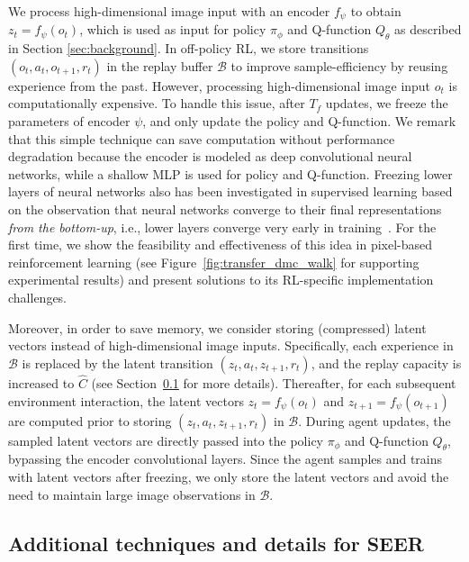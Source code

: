 \documentclass{article}
\begin{document}
We process high-dimensional image input with an encoder $f_{\psi}$ to obtain $z_t = f_{\psi}(o_t)$, which is used as input for policy $\pi_{\phi}$ and Q-function $Q_\theta$ as described in Section \ref{sec:background}. In off-policy RL, 
we store transitions $(o_t,a_t,o_{t+1},r_t)$ in the replay buffer $\mathcal{B}$ to improve sample-efficiency by reusing experience from the past.
However, processing high-dimensional image input $o_t$ is computationally expensive. 
To handle this issue, after $T_f$ updates,
we freeze the parameters of encoder $\psi$, and only update the policy and Q-function.
We remark that this simple technique can save computation without performance degradation because the encoder is modeled as deep convolutional neural networks, while a shallow MLP is used for policy and Q-function. Freezing lower layers of neural networks also has been investigated in supervised learning based on the observation that neural networks converge to their final representations {\em from the bottom-up}, i.e., lower layers converge very early in training~\citep{46337}. For the first time, we show the feasibility and effectiveness of this idea in pixel-based reinforcement learning (see Figure~\ref{fig:transfer_dmc_walk} for supporting experimental results) and present solutions to its RL-specific implementation challenges. 


Moreover, in order to save memory, 
we consider storing (compressed) latent vectors instead of high-dimensional image inputs.
Specifically, 
each experience in $\mathcal{B}$ is replaced by the latent transition $(z_t,a_t,z_{t+1},r_t)$, and the replay capacity is increased to $\widehat{C}$ (see Section~\ref{sec:detail} for more details). 
Thereafter, for each subsequent environment interaction, 
the latent vectors $z_t=f_\psi(o_t)$ and $z_{t+1}=f_\psi(o_{t+1})$ are computed prior to storing $(z_t,a_t,z_{t+1},r_t)$ in $\mathcal{B}$. During agent updates, the sampled latent vectors are directly passed into the policy $\pi_{\phi}$ and Q-function $Q_\theta$, bypassing the encoder convolutional layers. Since the agent samples and trains with latent vectors after freezing, we only store the latent vectors and avoid the need to maintain large image observations in $\mathcal{B}$.

\subsection{Additional techniques and details for SEER} \label{sec:detail}
\end{document}
